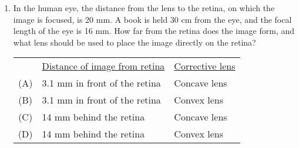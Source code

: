 \documentclass{../../../oss-apphys}
\begin{document}
\begin{multicols*}{2}
\begin{enumerate}[leftmargin=18pt]
  \item In the human eye, the distance from the lens to the retina, on which the
    image is focused, is 20 mm. A book is held 30 cm from the eye, and
    the focal length of the eye is 16 mm. How far from the retina does the
    image form, and what lens should be used to place the image directly
    on the retina?
    
    \begin{tabular}{cll}
      & \underline{Distance of image from retina}
      & \underline{Corrective lens} \\
      (A) & 3.1 mm in front of the retina & Concave lens \\
      (B) & 3.1 mm in front of the retina & Convex lens \\
      (C) & 14 mm behind the retina & Concave lens \\
      (D) & 14 mm behind the retina & Convex lens
    \end{tabular}
  \end{enumerate}
\end{multicols*}
\newpage


\genfreedirections
\end{document}
